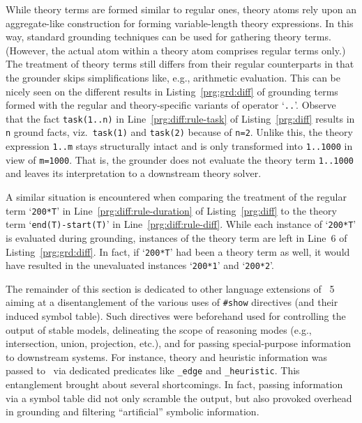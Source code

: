 While theory terms are formed similar to regular ones,
theory atoms rely upon an aggregate-like construction for forming variable-length theory expressions.
In this way, standard grounding techniques can be used for gathering theory terms.
(However, the actual atom within a theory atom comprises regular terms only.)
%
The treatment of theory terms still %
differs from their regular counterparts
in that the grounder skips simplifications like, e.g., arithmetic evaluation.
This can be nicely seen on the different results in Listing~\ref{prg:grd:diff} of grounding terms formed with
the regular and theory-specific variants of operator `\lstinline{..}'.
Observe that
the     fact \lstinline{task(1..n)} in Line~\ref{prg:diff:rule-task} of Listing~\ref{prg:diff} results in \lstinline{n} ground     facts,
viz.\ \lstinline{task(1)} and \lstinline{task(2)} because of \lstinline{n=2}.
Unlike this, the theory expression \lstinline{1..m} stays structurally intact and is only transformed into \lstinline{1..1000} in view of \lstinline{m=1000}.
That is, the grounder does not evaluate the theory term \lstinline{1..1000} and
leaves its interpretation to a downstream theory solver.
%

%
A similar situation is encountered when comparing the treatment of the regular term `\lstinline{200*T}' in Line~\ref{prg:diff:rule-duration} of Listing~\ref{prg:diff} to the
theory term `\lstinline{end(T)-start(T)}' in Line~\ref{prg:diff:rule-diff}.
While each instance of `\lstinline{200*T}' is evaluated during grounding,
instances of the theory term  are left in Line~6 of Listing~\ref{prg:grd:diff}.
In fact, if `\lstinline{200*T}' had been a theory term as well,
it would have resulted in the unevaluated instances  `\lstinline{200*1}' and `\lstinline{200*2}'. %

The remainder of this section is dedicated to other language extensions of \gringo~5 aiming
at a disentanglement of the various uses of \lstinline{#show} directives
(and their induced symbol table).
Such directives were beforehand used for
controlling the output of stable models,
delineating the scope of reasoning modes (e.g., intersection, union, projection, etc.),
and for
passing special-purpose information to downstream systems.
For instance,
theory and heuristic information was passed to \clasp\ via dedicated predicates like \lstinline{_edge} and \lstinline{_heuristic}.
This entanglement brought about several shortcomings.
In fact, passing information via a symbol table did not only scramble the output, but also provoked overhead in grounding and filtering ``artificial'' symbolic information.

